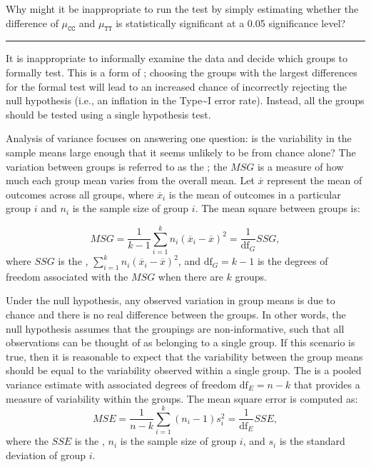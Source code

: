 \documentclass[
  letterpaper,
  DIV=11,
  numbers=noendperiod]{scrreprt}
\begin{document}
Why might it be inappropriate to run the test by simply estimating
whether the difference of \(\mu_{\texttt{CC}}\) and
\(\mu_{\texttt{TT}}\) is statistically significant at a 0.05
significance level?

\begin{center}\rule{0.5\linewidth}{0.5pt}\end{center}

It is inappropriate to informally examine the data and decide which
groups to formally test. This is a form of ; choosing
the groups with the largest differences for the formal test will lead to
an increased chance of incorrectly rejecting the null hypothesis (i.e.,
an inflation in the Type\textasciitilde I error rate). Instead, all the
groups should be tested using a single hypothesis test.

Analysis of variance focuses on answering one question: is the
variability in the sample means large enough that it seems unlikely to
be from chance alone? The variation between groups is referred to as the
; the \(MSG\) is a measure of
how much each group mean varies from the overall mean. Let
\(\overline{x}\) represent the mean of outcomes across all groups, where
\(\overline{x}_i\) is the mean of outcomes in a particular group \(i\)
and \(n_i\) is the sample size of group \(i\). The mean square between
groups is:

\[
MSG = \frac{1}{k-1}\sum_{i=1}^{k} n_{i}\left(\overline{x}_{i} - \overline{x}\right)^{2} = \frac{1}{\textrm{df}_{G}}SSG,
\] where \(SSG\) is the ,
\(\sum_{i=1}^{k} n_{i}\left(\overline{x}_{i} - \overline{x}\right)^{2}\),
and \(\textrm{df}_{G}=k-1\) is the degrees of freedom associated with
the \(MSG\) when there are \(k\) groups.

Under the null hypothesis, any observed variation in group means is due
to chance and there is no real difference between the groups. In other
words, the null hypothesis assumes that the groupings are
non-informative, such that all observations can be thought of as
belonging to a single group. If this scenario is true, then it is
reasonable to expect that the variability between the group means should
be equal to the variability observed within a single group. The
 is a pooled variance estimate with
associated degrees of freedom \(\textrm{df}_E=n-k\) that provides a
measure of variability within the groups. The mean square error is
computed as: \[
MSE = \frac{1}{n-k}\sum_{i=1}^{k} (n_i-1)s_i^{2} = \frac{1}{\textrm{df}_{E}}SSE,
\] where the \(SSE\) is the , \(n_i\) is the
sample size of group \(i\), and \(s_i\) is the standard deviation of
group \(i\).
\end{document}

